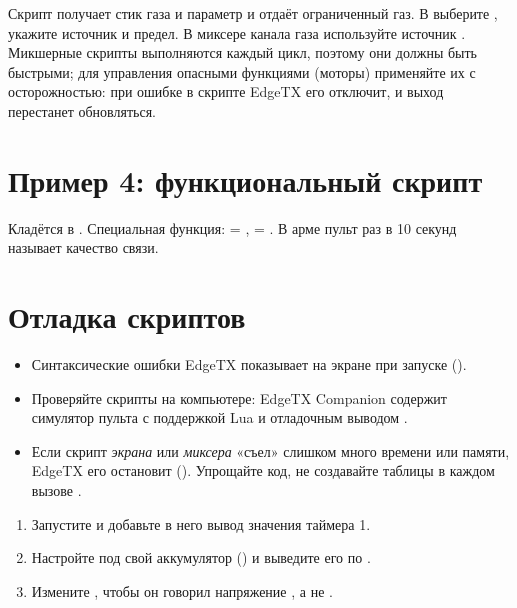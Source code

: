 
Скрипт получает стик газа и параметр  и отдаёт ограниченный газ. В
 выберите , укажите источник  и предел.
В миксере канала газа используйте источник . Микшерные скрипты выполняются
каждый цикл, поэтому они должны быть быстрыми; для управления опасными функциями
(моторы) применяйте их с осторожностью: при ошибке в скрипте EdgeTX его отключит, и выход
перестанет обновляться.

\section{Пример 4: функциональный скрипт}


Кладётся в . Специальная функция:  = ,
 = . В арме пульт раз в 10 секунд называет качество связи.

\section{Отладка скриптов}

\begin{itemize}
  \item Синтаксические ошибки EdgeTX показывает на экране при запуске ().
  \item Проверяйте скрипты на компьютере: EdgeTX Companion содержит симулятор пульта с
        поддержкой Lua и отладочным выводом .
  \item Если скрипт \emph{экрана} или \emph{миксера} «съел» слишком много времени или памяти,
        EdgeTX его остановит (). Упрощайте код, не создавайте таблицы в
        каждом вызове .
\end{itemize}

\begin{tasks}
\begin{enumerate}
  \item Запустите  и добавьте в него вывод значения таймера 1.
  \item Настройте  под свой аккумулятор () и выведите его по .
  \item Измените , чтобы он говорил напряжение , а не .
\end{enumerate}
\end{tasks}
